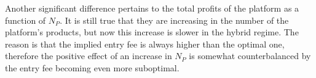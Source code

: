 Another significant difference pertains to the total profits of the platform as a function of $N_P$.
It is still true that they are increasing in the number of the platform's products, but now this increase is slower in the hybrid regime.
The reason is that the implied entry fee is always higher than the optimal one, therefore the positive effect of an increase in $N_P$ is somewhat counterbalanced by the entry fee becoming even more suboptimal.

\begin{figure}
    \centering
    \begin{subfigure}[b]{0.45\textwidth}
        \centering
\end{subfigure}
\end{figure}
